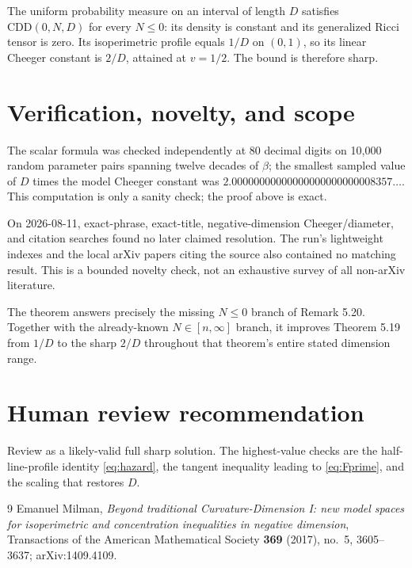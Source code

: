 \documentclass[11pt]{article}
\begin{document}
The uniform probability measure on an interval of length \(D\) satisfies
\(\mathrm{CDD}(0,N,D)\) for every \(N\le0\): its density is constant and its
generalized Ricci tensor is zero.  Its isoperimetric profile equals \(1/D\)
on \((0,1)\), so its linear Cheeger constant is \(2/D\), attained at
\(v=1/2\).  The bound is therefore sharp.

\section*{Verification, novelty, and scope}

The scalar formula was checked independently at 80 decimal digits on 10,000
random parameter pairs spanning twelve decades of \(\beta\); the smallest
sampled value of \(D\) times the model Cheeger constant was
\(2.00000000000000000000000008357\ldots\).  This computation is only a
sanity check; the proof above is exact.

On 2026-08-11, exact-phrase, exact-title, negative-dimension
Cheeger/diameter, and citation searches found no later claimed resolution.
The run's lightweight indexes and the local arXiv papers citing the source
also contained no matching result.  This is a bounded novelty check, not an
exhaustive survey of all non-arXiv literature.

The theorem answers precisely the missing \(N\le0\) branch of Remark 5.20.
Together with the already-known \(N\in[n,\infty]\) branch, it improves
Theorem 5.19 from \(1/D\) to the sharp \(2/D\) throughout that theorem's
entire stated dimension range.

\section*{Human review recommendation}

Review as a likely-valid full sharp solution.  The highest-value checks are
the half-line-profile identity \eqref{eq:hazard}, the tangent inequality
leading to \eqref{eq:Fprime}, and the scaling that restores \(D\).

\begin{thebibliography}{9}
Emanuel Milman,
\emph{Beyond traditional Curvature-Dimension I: new model spaces for
isoperimetric and concentration inequalities in negative dimension},
Transactions of the American Mathematical Society \textbf{369} (2017),
no.~5, 3605--3637; arXiv:1409.4109.
\end{thebibliography}
\end{document}
